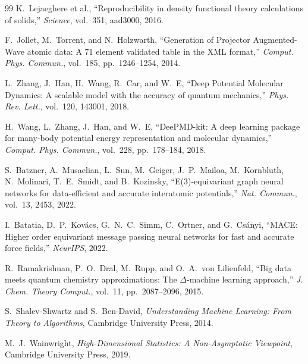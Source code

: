 \documentclass[11pt,a4paper]{article}
\theoremstyle{definition}
\begin{document}
\begin{thebibliography}{99}
K.~Lejaeghere et al., ``Reproducibility in density functional theory calculations of solids,'' \textit{Science}, vol.~351, aad3000, 2016.

F.~Jollet, M.~Torrent, and N.~Holzwarth, ``Generation of Projector Augmented-Wave atomic data: A 71 element validated table in the XML format,'' \textit{Comput. Phys. Commun.}, vol.~185, pp.~1246--1254, 2014.

L.~Zhang, J.~Han, H.~Wang, R.~Car, and W.~E, ``Deep Potential Molecular Dynamics: A scalable model with the accuracy of quantum mechanics,'' \textit{Phys. Rev. Lett.}, vol.~120, 143001, 2018.

H.~Wang, L.~Zhang, J.~Han, and W.~E, ``DeePMD-kit: A deep learning package for many-body potential energy representation and molecular dynamics,'' \textit{Comput. Phys. Commun.}, vol.~228, pp.~178--184, 2018.

S.~Batzner, A.~Musaelian, L.~Sun, M.~Geiger, J.~P.~Mailoa, M.~Kornbluth, N.~Molinari, T.~E.~Smidt, and B.~Kozinsky, ``E(3)-equivariant graph neural networks for data-efficient and accurate interatomic potentials,'' \textit{Nat. Commun.}, vol.~13, 2453, 2022.

I.~Batatia, D.~P.~Kov\'acs, G.~N.~C.~Simm, C.~Ortner, and G.~Cs\'anyi, ``MACE: Higher order equivariant message passing neural networks for fast and accurate force fields,'' \textit{NeurIPS}, 2022.

R.~Ramakrishnan, P.~O.~Dral, M.~Rupp, and O.~A.~von Lilienfeld, ``Big data meets quantum chemistry approximations: The $\Delta$-machine learning approach,'' \textit{J. Chem. Theory Comput.}, vol.~11, pp.~2087--2096, 2015.

S.~Shalev-Shwartz and S.~Ben-David, \textit{Understanding Machine Learning: From Theory to Algorithms}, Cambridge University Press, 2014.

M.~J.~Wainwright, \textit{High-Dimensional Statistics: A Non-Asymptotic Viewpoint}, Cambridge University Press, 2019.

\end{thebibliography}
\end{document}

